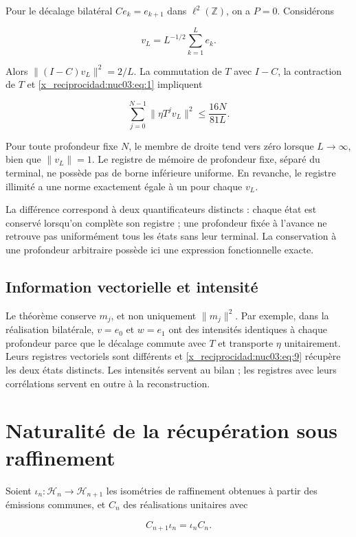 Pour le décalage bilatéral \(Ce_k=e_{k+1}\) dans \(\ell^2(\mathbb Z)\), on a \(P=0\). Considérons

\[
v_L=L^{-1/2}\sum_{k=1}^{L}e_k.
\]

Alors \(\|(I-C)v_L\|^2=2/L\). La commutation de \(T\) avec \(I-C\), la contraction de \(T\) et \eqref{x_reciprocidad:nuc03:eq:1} impliquent

\begin{equation}
\sum_{j=0}^{N-1}\|\eta T^jv_L\|^2
\leq\frac{16N}{81L}.
\label{x_reciprocidad:nuc03:eq:11}
\end{equation}

Pour toute profondeur fixe \(N\), le membre de droite tend vers zéro lorsque \(L\to\infty\), bien que \(\|v_L\|=1\). Le registre de mémoire de profondeur fixe, séparé du terminal, ne possède pas de borne inférieure uniforme. En revanche, le registre illimité a une norme exactement égale à un pour chaque \(v_L\).

La différence correspond à deux quantificateurs distincts : chaque état est conservé lorsqu’on complète son registre ; une profondeur fixée à l’avance ne retrouve pas uniformément tous les états sans leur terminal. La conservation à une profondeur arbitraire possède ici une expression fonctionnelle exacte.

\subsection{Information vectorielle et intensité}

Le théorème conserve \(m_j\), et non uniquement \(\|m_j\|^2\). Par exemple, dans la réalisation bilatérale, \(v=e_0\) et \(w=e_1\) ont des intensités identiques à chaque profondeur parce que le décalage commute avec \(T\) et transporte \(\eta\) unitairement. Leurs registres vectoriels sont différents et \eqref{x_reciprocidad:nuc03:eq:9} récupère les deux états distincts. Les intensités servent au bilan ; les registres avec leurs corrélations servent en outre à la reconstruction.

\section{Naturalité de la récupération sous raffinement}

Soient \(\iota_n:\mathcal H_n\to\mathcal H_{n+1}\) les isométries de raffinement obtenues à partir des émissions communes, et \(C_n\) des réalisations unitaires avec

\begin{equation}
C_{n+1}\iota_n=\iota_nC_n.
\label{x_reciprocidad:nuc03:eq:12}
\end{equation}

